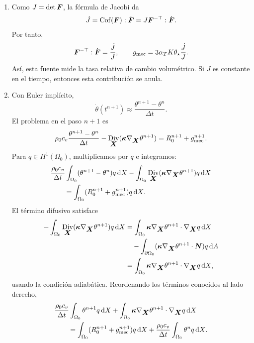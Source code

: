 \documentclass[11pt]{article}
\def\vec   #1{\mbox{\boldmath $#1$}{}}
\def\ten   #1{\mbox{\boldmath $#1$}{}}
\def\dX{\mbox{\(\,\mathrm{d}X\)}}
\def\dA{\mbox{\(\,\mathrm{d}A\)}}
\DeclareMathOperator{\Div}{Div}
\DeclareMathOperator{\Cof}{Cof}
\begin{document}
\begin{enumerate}[label=\textbf{\arabic*.}, leftmargin=*]
\begin{enumerate}[label=(\alph*)]
        \item Como $J=\det\ten F$, la fórmula de Jacobi da
        \[
            \dot J=\Cof(\ten F):\dot{\ten F}
            =
            J\ten F^{-\top}:\dot{\ten F}.
        \]
        Por tanto,
        \[
            \ten F^{-\top}:\dot{\ten F}=\frac{\dot J}{J},
            \qquad
            g_{\mathrm{mec}}=3\alpha_TK\theta_\star\frac{\dot J}{J}.
        \]
        Así, esta fuente mide la tasa relativa de cambio volumétrico. Si $J$ es constante en el tiempo, entonces esta contribución se anula.

        \item Con Euler implícito,
        \[
            \dot\theta(t^{n+1})\approx\frac{\theta^{n+1}-\theta^n}{\Delta t}.
        \]
        El problema en el paso $n+1$ es
        \[
            \rho_0c_v\frac{\theta^{n+1}-\theta^n}{\Delta t}
            -\Div_{\vec X}(\ten\kappa\nabla_{\vec X}\theta^{n+1})
            =
            R_0^{n+1}+g_{\mathrm{mec}}^{n+1}.
        \]
        Para $q\in H^1(\Omega_0)$, multiplicamos por $q$ e integramos:
        \[
        \begin{aligned}
            &\frac{\rho_0c_v}{\Delta t}
            \int_{\Omega_0}(\theta^{n+1}-\theta^n)q\dX
            -\int_{\Omega_0}
            \Div_{\vec X}(\ten\kappa\nabla_{\vec X}\theta^{n+1})q\dX\\
            &\qquad=
            \int_{\Omega_0}
            (R_0^{n+1}+g_{\mathrm{mec}}^{n+1})q\dX.
        \end{aligned}
        \]
        El término difusivo satisface
        \[
        \begin{aligned}
            -\int_{\Omega_0}
            \Div_{\vec X}(\ten\kappa\nabla_{\vec X}\theta^{n+1})q\dX
            &=
            \int_{\Omega_0}
            \ten\kappa\nabla_{\vec X}\theta^{n+1}\cdot\nabla_{\vec X}q\dX\\
            &\quad
            -\int_{\partial\Omega_0}
            (\ten\kappa\nabla_{\vec X}\theta^{n+1}\cdot\vec N)q\dA\\
            &=
            \int_{\Omega_0}
            \ten\kappa\nabla_{\vec X}\theta^{n+1}\cdot\nabla_{\vec X}q\dX,
        \end{aligned}
        \]
        usando la condición adiabática. Reordenando los términos conocidos al lado derecho,
        \[
        \begin{aligned}
            &\frac{\rho_0c_v}{\Delta t}\int_{\Omega_0}\theta^{n+1}q\dX
            +\int_{\Omega_0}\ten\kappa\nabla_{\vec X}\theta^{n+1}\cdot\nabla_{\vec X}q\dX\\
            &\qquad=
            \int_{\Omega_0}(R_0^{n+1}+g_{\mathrm{mec}}^{n+1})q\dX
            +\frac{\rho_0c_v}{\Delta t}\int_{\Omega_0}\theta^nq\dX.
        \end{aligned}
        \]


\end{enumerate}
\end{enumerate}
\end{document}
